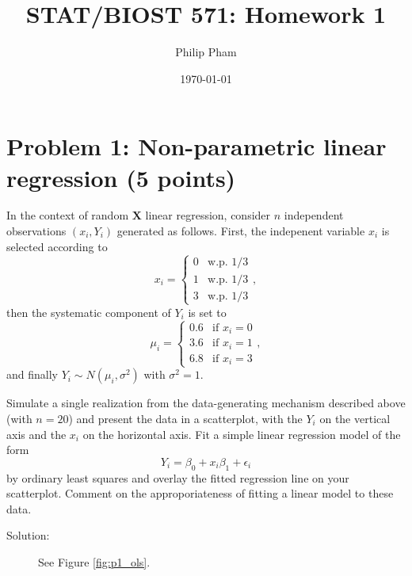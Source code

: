 \documentclass[11pt, letterpaper]{article}
\title{STAT/BIOST 571: Homework 1}
\date{\today}
\author{Philip Pham}
\newcommand{\bX}{{\bm X}}
\begin{document}
\maketitle

\section*{Problem 1: Non-parametric linear regression (5 points)}
{In the context of random $\bX$ linear regression, consider $n$ independent observations $(x_i, Y_i)$ generated as follows.  
First, the indepenent variable $x_i$ is selected according to 
\[
x_i = \left\{ \begin{array}{cl} 0 & \textrm{w.p. 1/3} \\  
                                          1 & \textrm{w.p. 1/3} \\ 
                                          3 & \textrm{w.p. 1/3} \end{array} \right. ,
\]
then the systematic component of $Y_i$ is set to
\[
\mu_i = \left\{ \begin{array}{cl} 0.6 & \textrm{if } x_i = 0 \\  
                                           3.6& \textrm{if } x_i=1 \\ 
                                          6.8 &\textrm{if } x_i=3 \end{array} \right. ,
\]
and finally $Y_i \sim N(\mu_i , \sigma^2)$ with $\sigma^2=1$.  
\begin{enumerate}[(a)]
{\item Simulate a single realization from the data-generating mechanism described above (with $n=20$)
and present the data in a scatterplot, with the $Y_i$ on the vertical axis and the $x_i$ on the horizontal axis.  Fit a simple linear regression model of the form
\[
Y_i = \beta_0 + x_i \beta_1 + \epsilon_i
\]
by ordinary least squares and overlay the fitted regression line on your scatterplot.  Comment on the approporiateness of fitting a linear model to these data.}

\begin{description}
\item[Solution:] See Figure \ref{fig:p1_ols}. 
  

\end{description}
\end{enumerate}}
\end{document}
